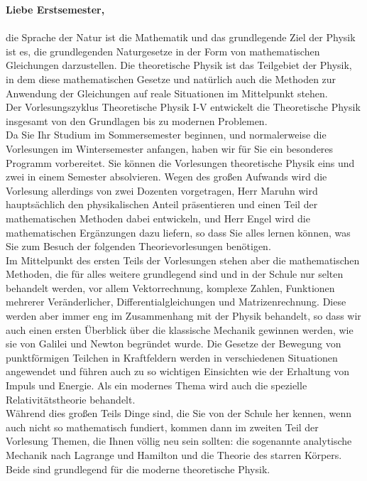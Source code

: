 \textbf{Liebe Erstsemester,} \\
\\
die Sprache der Natur ist die Mathematik und das grundlegende Ziel der Physik ist es, die grundlegenden Naturgesetze in der Form von mathematischen Gleichungen darzustellen. Die theoretische Physik ist das Teilgebiet der Physik, in dem diese mathematischen Gesetze und natürlich auch die Methoden zur Anwendung der Gleichungen auf reale Situationen im Mittelpunkt stehen.
\\
Der Vorlesungszyklus Theoretische Physik I-V entwickelt die Theoretische Physik insgesamt von den Grundlagen bis zu modernen Problemen.
\\
Da Sie Ihr Studium im Sommersemester beginnen, und normalerweise die Vorlesungen im Wintersemester anfangen, haben wir für Sie ein besonderes Programm vorbereitet. Sie können die Vorlesungen theoretische Physik eins und zwei in einem Semester absolvieren. Wegen des großen Aufwands wird die Vorlesung allerdings von zwei Dozenten vorgetragen, Herr Maruhn wird hauptsächlich den physikalischen Anteil präsentieren und einen Teil der mathematischen Methoden dabei entwickeln, und Herr Engel wird die mathematischen Ergänzungen dazu liefern, so dass Sie alles lernen können, was Sie zum Besuch der folgenden Theorievorlesungen benötigen.
\\
Im Mittelpunkt des ersten Teils der Vorlesungen stehen aber die mathematischen Methoden, die für alles weitere grundlegend sind und in der Schule nur selten behandelt werden, vor allem Vektorrechnung, komplexe Zahlen, Funktionen mehrerer Veränderlicher, Differentialgleichungen und Matrizenrechnung.
Diese werden aber immer eng im Zusammenhang mit der Physik behandelt, so dass wir auch einen ersten Überblick über die klassische Mechanik gewinnen werden, wie sie von Galilei und Newton begründet wurde. Die Gesetze der Bewegung von punktförmigen Teilchen in Kraftfeldern werden in verschiedenen Situationen angewendet und führen auch zu so wichtigen Einsichten wie der Erhaltung von Impuls und Energie. Als ein modernes Thema wird auch die spezielle Relativitätstheorie behandelt.
\\
Während dies großen Teils Dinge sind, die Sie von der Schule her kennen, wenn auch nicht so mathematisch fundiert, kommen dann im zweiten Teil der Vorlesung Themen, die Ihnen völlig neu sein sollten: die sogenannte analytische Mechanik nach Lagrange und Hamilton und die Theorie des starren Körpers. Beide sind grundlegend für die moderne theoretische Physik.
\\
